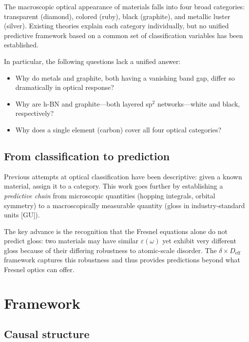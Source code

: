 \documentclass[twocolumn,showpacs,preprintnumbers,amsmath,amssymb,prb]{revtex4-2}
\begin{document}
The macroscopic optical appearance of materials falls into four broad
categories: transparent (diamond), colored (ruby), black (graphite),
and metallic luster (silver). Existing theories explain each category
individually, but no unified predictive framework based on a common set
of classification variables has been established.

In particular, the following questions lack a unified answer:
\begin{itemize}
  \item Why do metals and graphite, both having a vanishing band gap,
    differ so dramatically in optical response?
  \item Why are h-BN and graphite---both layered sp$^2$
    networks---white and black, respectively?
  \item Why does a single element (carbon) cover all four optical
    categories?
\end{itemize}

\subsection{From classification to prediction}

Previous attempts at optical classification have been descriptive: given
a known material, assign it to a category. This work goes further by
establishing a \emph{predictive chain} from microscopic quantities
(hopping integrals, orbital symmetry) to a macroscopically measurable
quantity (gloss in industry-standard units [GU]).

The key advance is the recognition that the Fresnel equations alone do
not predict gloss: two materials may have similar $\varepsilon(\omega)$
yet exhibit very different gloss because of their differing robustness
to atomic-scale disorder. The $\delta \times D_\mathrm{eff}$ framework
captures this robustness and thus provides predictions beyond what
Fresnel optics can offer.

\section{Framework}
\label{sec:framework}

\subsection{Causal structure}
\end{document}
